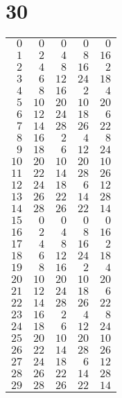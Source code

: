 \documentclass[a4paper]{scrartcl}
\begin{document}
\section*{30}
\begin{tabular}{rrrrr}
\toprule
$0$ & $0$ & $0$ & $0$ & $0$ \\
$1$ & $2$ & $4$ & $8$ & $16$ \\
$2$ & $4$ & $8$ & $16$ & $2$ \\
$3$ & $6$ & $12$ & $24$ & $18$ \\
$4$ & $8$ & $16$ & $2$ & $4$ \\
$5$ & $10$ & $20$ & $10$ & $20$ \\
$6$ & $12$ & $24$ & $18$ & $6$ \\
$7$ & $14$ & $28$ & $26$ & $22$ \\
$8$ & $16$ & $2$ & $4$ & $8$ \\
$9$ & $18$ & $6$ & $12$ & $24$ \\
$10$ & $20$ & $10$ & $20$ & $10$ \\
$11$ & $22$ & $14$ & $28$ & $26$ \\
$12$ & $24$ & $18$ & $6$ & $12$ \\
$13$ & $26$ & $22$ & $14$ & $28$ \\
$14$ & $28$ & $26$ & $22$ & $14$ \\
$15$ & $0$ & $0$ & $0$ & $0$ \\
$16$ & $2$ & $4$ & $8$ & $16$ \\
$17$ & $4$ & $8$ & $16$ & $2$ \\
$18$ & $6$ & $12$ & $24$ & $18$ \\
$19$ & $8$ & $16$ & $2$ & $4$ \\
$20$ & $10$ & $20$ & $10$ & $20$ \\
$21$ & $12$ & $24$ & $18$ & $6$ \\
$22$ & $14$ & $28$ & $26$ & $22$ \\
$23$ & $16$ & $2$ & $4$ & $8$ \\
$24$ & $18$ & $6$ & $12$ & $24$ \\
$25$ & $20$ & $10$ & $20$ & $10$ \\
$26$ & $22$ & $14$ & $28$ & $26$ \\
$27$ & $24$ & $18$ & $6$ & $12$ \\
$28$ & $26$ & $22$ & $14$ & $28$ \\
$29$ & $28$ & $26$ & $22$ & $14$ \\
\bottomrule
\end{tabular}
\end{document}
